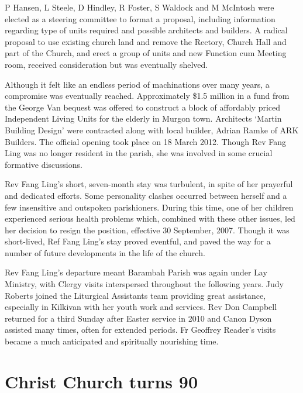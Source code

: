 P Hansen, L Steele, D Hindley, R Foster, S Waldock and M McIntosh were elected as a steering committee to format a proposal, including information regarding type of units required and possible architects and builders. A radical proposal to use existing church land and remove the Rectory, Church Hall and part of the Church, and erect a group of units and new Function cum Meeting room, received consideration but was eventually shelved.



Although it felt like an endless period of machinations over many years, a compromise was eventually reached. Approximately \$1.5 million in a fund from the George Van bequest was offered to construct a block of affordably priced Independent Living Units for the elderly in Murgon town. Architects `Martin Building Design' were contracted along with local builder, Adrian Ramke of ARK Builders. The official opening took place on 18 March 2012. Though Rev Fang Ling was no longer resident in the parish, she was involved in some crucial formative discussions.



Rev Fang Ling's short, seven-month stay was turbulent, in spite of her prayerful and dedicated efforts. Some personality clashes occurred between herself and a few insensitive and outspoken parishioners. During this time, one of her children experienced serious health problems which, combined with these other issues, led her decision to resign the position, effective 30 September, 2007. Though it was short-lived, Ref Fang Ling's stay proved eventful, and paved the way for a number of future developments in the life of the church.



Rev Fang Ling's departure meant Barambah Parish was again under Lay Ministry, with Clergy visits interspersed throughout the following years. Judy Roberts joined the Liturgical Assistants team providing great assistance, especially in Kilkivan with her youth work and services. Rev Don Campbell returned for a third Sunday after Easter service in 2010 and Canon Dyson assisted many times, often for extended periods. Fr Geoffrey Reader's visits became a much anticipated and spiritually nourishing time.



\section{Christ Church turns 90}



